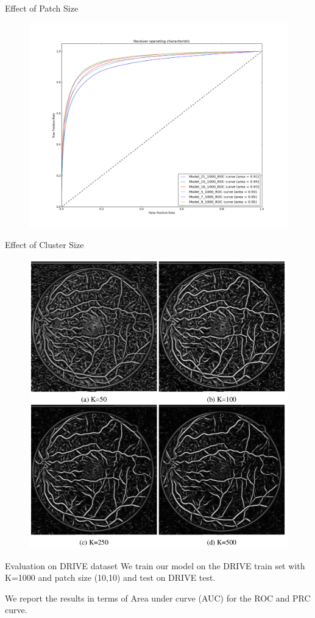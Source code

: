 \documentclass{beamer}
\begin{document}
	\begin{frame}{Effect of Patch Size}
		\begin{figure}
			\includegraphics[width=.55\textwidth]{framework/allmod}
			
		\end{figure}
	\end{frame}
	\begin{frame}{Effect of Cluster Size}
		\begin{figure}
			\includegraphics[width=.55\textwidth]{framework/clustersize}
		
		\end{figure}
	\end{frame}
	\begin{frame}{Evaluation on DRIVE dataset}
		We train our model on the DRIVE train set with K=1000 and patch size (10,10) and test on DRIVE test.
		
		We report the results in terms of Area under curve (AUC) for the ROC and PRC curve.
	\end{frame}
	
\end{document}
